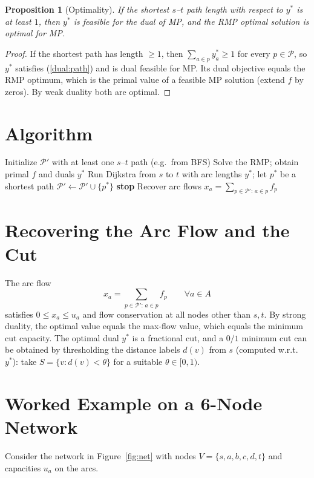 \documentclass[11pt]{article}
\newtheorem{proposition}{Proposition}
\begin{document}
\begin{proposition}[Optimality]
If the shortest $s$--$t$ path length with respect to $y^*$ is at least $1$, then $y^*$ is feasible for the dual of MP, and the RMP optimal solution is optimal for MP.
\end{proposition}
\begin{proof}
If the shortest path has length $\ge 1$, then $\sum_{a\in p}y^*_a\ge 1$ for every $p\in\mathcal{P}$, so $y^*$ satisfies (\ref{dual:path}) and is dual feasible for MP. Its dual objective equals the RMP optimum, which is the primal value of a feasible MP solution (extend $f$ by zeros). By weak duality both are optimal.
\end{proof}

\section{Algorithm}
\begin{algorithm}[h]
\caption{Column generation for path-based max flow}
\begin{algorithmic}[1]
\State Initialize $\mathcal{P}'$ with at least one $s$--$t$ path (e.g.\ from BFS)
\Loop
  \State Solve the RMP; obtain primal $f$ and duals $y^*$
  \State Run Dijkstra from $s$ to $t$ with arc lengths $y^*$; let $p^*$ be a shortest path
    \State $\mathcal{P}'\leftarrow \mathcal{P}'\cup\{p^*\}$
  \Else
    \State \textbf{stop}
  \EndIf
\EndLoop
\State Recover arc flows $x_a=\sum_{p\in\mathcal{P}':\,a\in p} f_p$
\end{algorithmic}
\end{algorithm}

\section{Recovering the Arc Flow and the Cut}
The arc flow
\begin{equation}
x_a=\sum_{p\in\mathcal{P}':\,a\in p} f_p \qquad \forall a\in A
\end{equation}
satisfies $0\le x_a\le u_a$ and flow conservation at all nodes other than $s,t$. By strong duality, the optimal value equals the max-flow value, which equals the minimum cut capacity. The optimal dual $y^*$ is a fractional cut, and a $0/1$ minimum cut can be obtained by thresholding the distance labels $d(v)$ from $s$ (computed w.r.t.\ $y^*$): take $S=\{v: d(v)<\theta\}$ for a suitable $\theta\in[0,1)$.

\section{Worked Example on a 6-Node Network}
Consider the network in Figure~\ref{fig:net} with nodes $V=\{s,a,b,c,d,t\}$ and capacities $u_a$ on the arcs.
\end{document}
